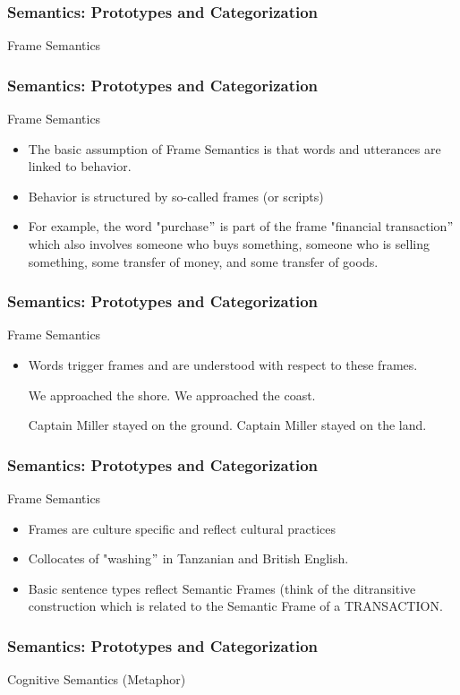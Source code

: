 \documentclass[12pt, table]{beamer}
\begin{document}
\begin{frame}
\frametitle{Semantics: Prototypes and Categorization}
Frame Semantics 
\end{frame}

\begin{frame}
\frametitle{Semantics: Prototypes and Categorization}
Frame Semantics
\begin{itemize}
\item The basic assumption of Frame Semantics is that words and utterances are linked to behavior.
\item Behavior is structured by so-called frames (or scripts)
\item For example, the word "purchase$"$ is part of the frame "financial transaction$"$ which also involves someone who buys something, someone who is selling something, some transfer of money, and some transfer of goods.
\end{itemize}
\end{frame}

\begin{frame}
\frametitle{Semantics: Prototypes and Categorization}
Frame Semantics
\begin{itemize}
\item Words trigger frames and are understood with respect to these frames.
\begin{exe}
\ex We approached the shore.
\ex We approached the coast. 
\end{exe}
\begin{exe}
\ex Captain Miller stayed on the ground.
\ex Captain Miller stayed on the land. 
\end{exe}
\end{itemize}
\end{frame}

\begin{frame}
\frametitle{Semantics: Prototypes and Categorization}
Frame Semantics
\begin{itemize}
\item Frames are culture specific and reflect cultural practices
\item Collocates of "washing$"$ in Tanzanian and British English. 
\item Basic sentence types reflect Semantic Frames (think of the ditransitive construction which is related to the Semantic Frame of a TRANSACTION.
\end{itemize}
\end{frame}

\begin{frame}
\frametitle{Semantics: Prototypes and Categorization}
Cognitive Semantics (Metaphor)
\end{frame}
\end{document}
